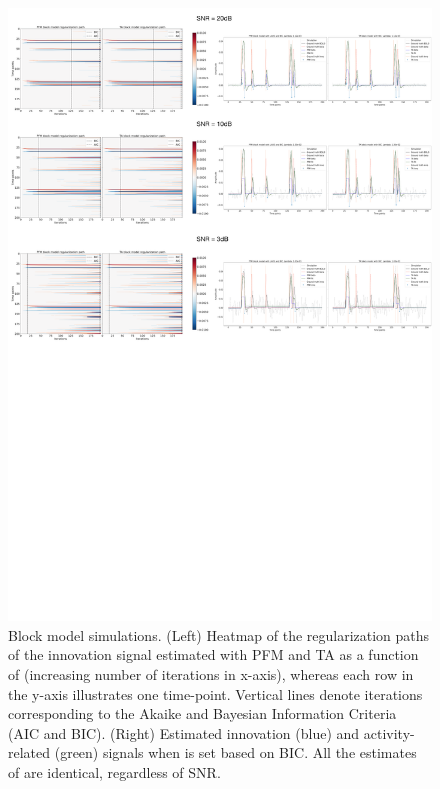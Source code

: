 \begin{figure}[t!]
    \begin{center}
        \includegraphics[width=\textwidth]{figures/regpath_block.pdf}
    \end{center}
    \caption{Block model simulations. (Left) Heatmap of the regularization paths of the innovation signal estimated with PFM and TA as a function of (increasing number of iterations in x-axis), whereas each row in the y-axis illustrates one time-point. Vertical lines denote iterations corresponding to the Akaike and Bayesian Information Criteria (AIC and BIC). (Right) Estimated innovation (blue) and activity-related (green) signals when is set based on BIC. All the estimates of are identical, regardless of SNR.}
\label{fig:path_block}
\end{figure}

